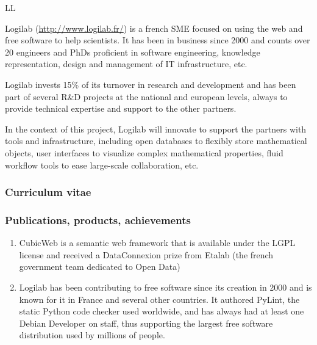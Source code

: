 \begin{sitedescription}{LL}

Logilab (\url{http://www.logilab.fr/}) is a french SME focused on using the web and free software to help
scientists. It has been in business since 2000 and counts over 20 engineers and
PhDs proficient in software engineering, knowledge representation, design and
management of IT infrastructure, etc.

Logilab invests 15\% of its turnover in research and development and has been
part of several R\&D projects at the national and european levels, always to
provide technical expertise and support to the other partners.

In the context of this project, Logilab will innovate to support the partners
with tools and infrastructure, including open databases to flexibly store
mathematical objects, user interfaces to visualize complex mathematical
properties, fluid workflow tools to ease large-scale collaboration, etc.



\subsubsection*{Curriculum vitae}








\subsubsection*{Publications, products, achievements}

\begin{enumerate}
 \item CubicWeb is a semantic web framework that is available under the LGPL
   license and received a DataConnexion prize from Etalab (the french government
   team dedicated to Open Data)

\item Logilab has been contributing to free software since its creation in 2000
  and is known for it in France and several other countries. It authored PyLint,
  the static Python code checker used worldwide, and has always had at least one
  Debian Developer on staff, thus supporting the largest free software
  distribution used by millions of people.


\end{enumerate}
\end{sitedescription}
